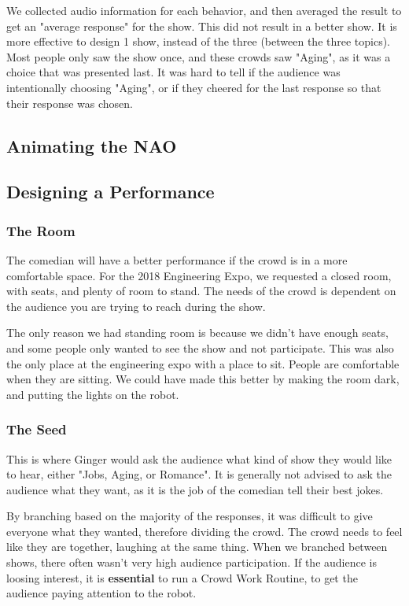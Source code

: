         We collected audio information for each behavior, and then averaged the result to get an "average response" for the show.
        This did not result in a better show. It is more effective to design 1 show, instead of the three (between the three topics).
        Most people only saw the show once, and these crowds saw "Aging", as it was a choice that was presented last.
        It was hard to tell if the audience was intentionally choosing "Aging", or if they cheered for the last response so that their response was chosen.
        
\subsection{Animating the NAO}
\subsection{Designing a Performance}

    \subsubsection{The Room}
    The comedian will have a better performance if the crowd is in a more comfortable space.
    For the 2018 Engineering Expo, we requested a closed room, with seats, and plenty of room to stand.
    The needs of the crowd is dependent on the audience you are trying to reach during the show.


    The only reason we had standing room is because we didn't have enough seats, and some people only wanted to see the show and not participate.
    This was also the only place at the engineering expo with a place to sit.
    People are comfortable when they are sitting.
    We could have made this better by making the room dark, and putting the lights on the robot.
    \subsubsection{The Seed}
    This is where Ginger would ask the audience what kind of show they would like to hear, either "Jobs, Aging, or Romance".
    It is generally not advised to ask the audience what they want, as it is the job of the comedian tell their best jokes.


    By branching based on the majority of the responses, it was difficult to give everyone what they wanted, therefore dividing the crowd.
    The crowd needs to feel like they are together, laughing at the same thing.
    When we branched between shows, there often wasn't very high audience participation.
    If the audience is loosing interest, it is \textbf{essential} to run a Crowd Work Routine, to get the audience paying attention to the robot.
